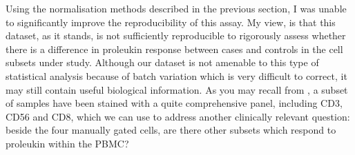 %

Using the normalisation methods described in the previous section, I was unable to significantly improve the reproducibility of this assay.
My view, is that this dataset, as it stands, is not sufficiently reproducible to rigorously assess whether there is a difference in proleukin response between cases and controls in the cell subsets under study.
Although our dataset is not amenable to this type of statistical analysis because of batch variation which is very difficult to correct, it may still contain useful biological information.
As you may recall from , a subset of samples have been stained with a quite comprehensive panel, including CD3, CD56 and CD8, which we can use to address another clinically relevant question:
beside the four manually gated cells, are there other subsets which respond to proleukin within the \gls{PBMC}?

